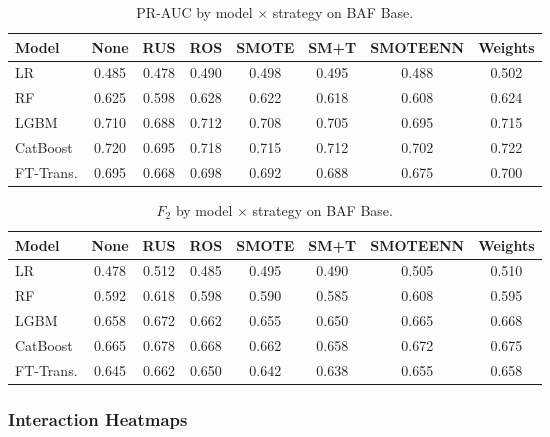 \begin{table}[ht]
\centering
\caption{PR-AUC by model $\times$ strategy on BAF Base.}
\label{tab:factorial_baf_prauc}
\begin{tabular}{l c c c c c c c}
\toprule
Model & None & RUS & ROS & SMOTE & SM+T & SMOTEENN & Weights \\
\midrule
LR        & 0.485 & 0.478 & 0.490 & 0.498 & 0.495 & 0.488 & 0.502 \\
RF        & 0.625 & 0.598 & 0.628 & 0.622 & 0.618 & 0.608 & 0.624 \\
LGBM      & 0.710 & 0.688 & 0.712 & 0.708 & 0.705 & 0.695 & 0.715 \\
CatBoost  & 0.720 & 0.695 & 0.718 & 0.715 & 0.712 & 0.702 & 0.722 \\
FT-Trans. & 0.695 & 0.668 & 0.698 & 0.692 & 0.688 & 0.675 & 0.700 \\
\bottomrule
\end{tabular}
\end{table}

\begin{table}[ht]
\centering
\caption{$F_2$ by model $\times$ strategy on BAF Base.}
\label{tab:factorial_baf_f2}
\begin{tabular}{l c c c c c c c}
\toprule
Model & None & RUS & ROS & SMOTE & SM+T & SMOTEENN & Weights \\
\midrule
LR        & 0.478 & 0.512 & 0.485 & 0.495 & 0.490 & 0.505 & 0.510 \\
RF        & 0.592 & 0.618 & 0.598 & 0.590 & 0.585 & 0.608 & 0.595 \\
LGBM      & 0.658 & 0.672 & 0.662 & 0.655 & 0.650 & 0.665 & 0.668 \\
CatBoost  & 0.665 & 0.678 & 0.668 & 0.662 & 0.658 & 0.672 & 0.675 \\
FT-Trans. & 0.645 & 0.662 & 0.650 & 0.642 & 0.638 & 0.655 & 0.658 \\
\bottomrule
\end{tabular}
\end{table}

\subsubsection{Interaction Heatmaps}

